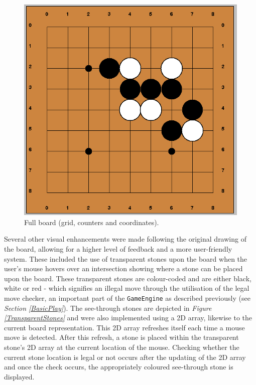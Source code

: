\documentclass{l3proj}
\begin{document}
\begin{figure}[H]
\centering
\includegraphics[scale=0.5]{Images/GUI-3-CountersCoords.png}
\caption{Full board (grid, counters and coordinates).}
\label{GUIBoard}
\end{figure}

Several other visual enhancements were made following the original drawing of the board, allowing for a higher level of feedback and a more user-friendly system. These included the use of transparent stones upon the board when the user's mouse hovers over an intersection showing where a stone can be placed upon the board. These transparent stones are colour-coded and are either black, white or red - which signifies an illegal move through the utilisation of the legal move checker, an important part of the \texttt{GameEngine} as described previously (see \textit{Section \ref{BasicPlay}}). The see-through stones are depicted in \textit{Figure \ref{TransparentStones}} and were also implemented using a 2D array, likewise to the current board representation. This 2D array refreshes itself each time a mouse move is detected. After this refresh, a stone is placed within the transparent stone's 2D array at the current location of the mouse. Checking whether the current stone location is legal or not occurs after the updating of the 2D array and once the check occurs, the appropriately coloured see-through stone is displayed.
\end{document}
